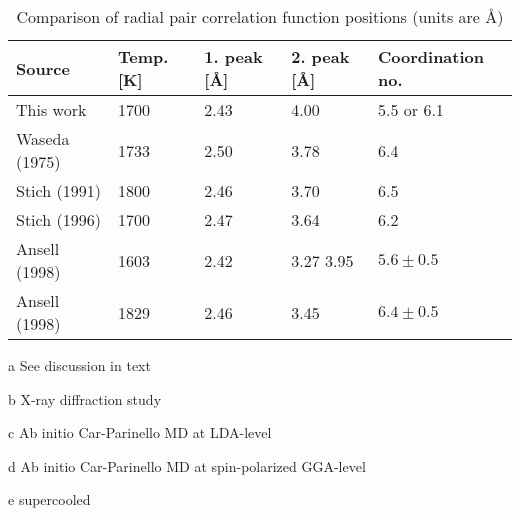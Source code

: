 \documentclass[11pt,bibliography=totoc,index=totoc]{scrbook}   %
\begin{document}
\begin{table}[htbp]
   \centering
   \begin{threeparttable}[htbp]
     \begin{tabular}{lllll}
        \toprule
          Source & Temp. [K] & 1. peak [Å] & 2. peak [Å] & Coordination no. \\
        \midrule
          This work 
          & 1700                  & 2.43 & 4.00       & 5.5 or 6.1\tnote{a}  \\
          Waseda (1975)\cite{Waseda:1975}\tnote{b}
            & 1733                  & 2.50 & 3.78       & 6.4   \\
          Stich (1991)\cite{Stich:1991}\tnote{c}    
            & 1800                  & 2.46 & 3.70       & 6.5   \\
          Stich (1996)\cite{Stich:1996}\tnote{d}    
            & 1700                  & 2.47 & 3.64       & 6.2   \\
          Ansell (1998)\cite{Ansell:1998}\tnote{b,e}
            & 1603                  & 2.42 & 3.27 3.95  & $5.6\pm 0.5$   \\
          Ansell (1998)\cite{Ansell:1998}\tnote{b}      
            & 1829                  & 2.46 & 3.45       & $6.4\pm 0.5$   \\
       \bottomrule
     \end{tabular}
     {\footnotesize
       \begin{tablenotes}
         \item[a] See discussion in text
         \item[b] X-ray diffraction study
         \item[c] Ab initio Car-Parinello MD at LDA-level
         \item[d] Ab initio Car-Parinello MD at spin-polarized GGA-level
         \item[e] supercooled
       \end{tablenotes}
     }
   \end{threeparttable}
   \caption{Comparison of radial pair correlation function positions (units are Å)}
   \label{tab:pcf}
\end{table}
\end{document}
